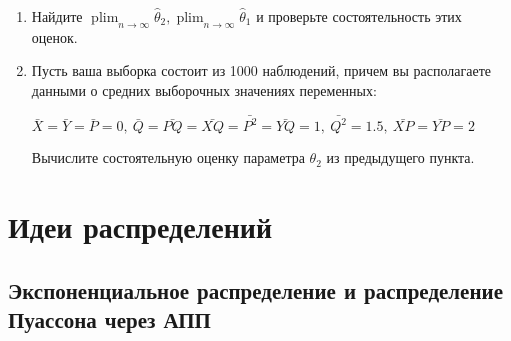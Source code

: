 \documentclass[10pt, a4paper]{extarticle}
\DeclareMathOperator{\plim}{plim}
\begin{document}
\begin{enumerate}
	\item  Найдите $\plim_{n \to \infty} \hat \theta_{2}, \plim_{n \to \infty} \hat \theta_{1}$  и проверьте состоятельность этих оценок.
	
	\item Пусть ваша выборка состоит из 1000 наблюдений, причем вы располагаете данными о средних выборочных значениях переменных:
	
	$\bar{X} = \bar{Y} = \bar{P} = 0, \ \bar{Q} = \bar{PQ} = \bar{XQ} = \bar{P^2} = \bar{YQ} = 1, \ \bar{Q^2} = 1.5, \ \bar{XP} = \bar{YP} = 2$
	
	Вычислите состоятельную оценку параметра $\theta_2$ из предыдущего пункта.
\end{enumerate}



\section{Идеи распределений}

\subsection{Экспоненциальное распределение и распределение Пуассона через АПП}
\end{document}
